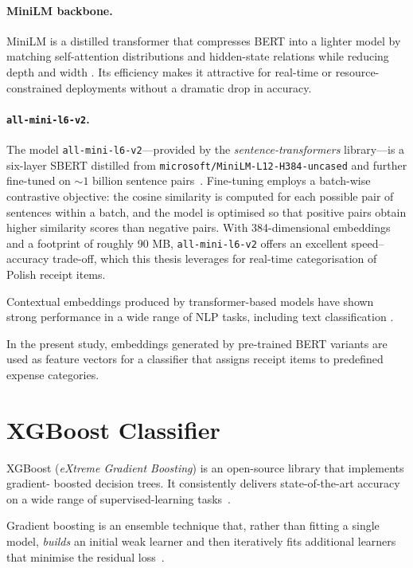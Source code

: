 \documentclass{SGGW-thesis-EN}
\begin{document}
\paragraph{MiniLM backbone.}
MiniLM is a distilled transformer that compresses BERT into a lighter model by matching
self-attention distributions and hidden-state relations while reducing depth and width
\cite{wang2020minilm}.
Its efficiency makes it attractive for real-time or resource-constrained deployments without
a dramatic drop in accuracy.

\paragraph{\texttt{all-mini-l6-v2}.}
The model \texttt{all-mini-l6-v2}—provided by the \emph{sentence-transformers} library—is a
six-layer SBERT distilled from \texttt{microsoft/MiniLM-L12-H384-uncased} and further
fine-tuned on \(\sim 1\) billion sentence pairs~\cite{reimers2021allminilm}.
Fine-tuning employs a batch-wise contrastive objective: the cosine similarity is computed for
each possible pair of sentences within a batch, and the model is optimised so that positive
pairs obtain higher similarity scores than negative pairs.
With 384-dimensional embeddings and a footprint of roughly 90 MB,
\texttt{all-mini-l6-v2} offers an excellent speed–accuracy trade-off, which this thesis
leverages for real-time categorisation of Polish receipt items.

Contextual embeddings produced by transformer-based models have shown strong performance in a
wide range of NLP tasks, including text classification \cite{devlin2019bertpretrainingdeepbidirectional}.

In the present study, embeddings generated by pre-trained BERT variants are used as feature
vectors for a classifier that assigns receipt items to predefined expense categories.

\section{XGBoost Classifier}

XGBoost (\emph{eXtreme Gradient Boosting}) is an open-source library that implements gradient-
boosted decision trees.
It consistently delivers state-of-the-art accuracy on a wide range of supervised-learning tasks~\cite{Chen_2016}.

Gradient boosting is an ensemble technique that, rather than fitting a single model,
\emph{builds} an initial weak learner and then iteratively fits additional learners that
minimise the residual loss~\cite{natekin2013gradient}.
\end{document}
